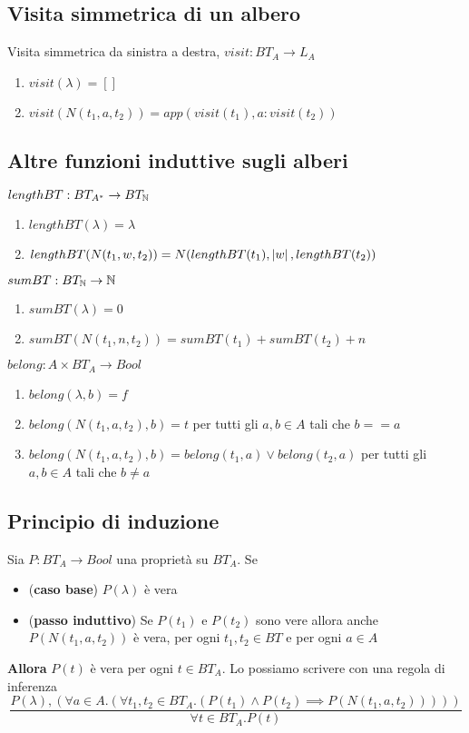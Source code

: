 \documentclass{article}
\begin{document}
\subsection*{Visita simmetrica di un albero}
Visita simmetrica da sinistra a destra, \(visit: BT_A \rightarrow L_A\)
\begin{enumerate}
    \item \(visit(\lambda) = []\)
    \item \(visit(N(t_1, a, t_2)) = app(visit(t_1), a: visit(t_2))\)
\end{enumerate}
\subsection*{Altre funzioni induttive sugli alberi}
\(lengthBT: BT_{A^*} \rightarrow BT_{\mathbb{N}}\)
\begin{enumerate}
    \item \(lengthBT(\lambda) = \lambda\)
    \item \(lengthBT(N(t_1, w, t_2)) = N(lengthBT(t_1), \left\lvert w \right\rvert, lengthBT(t_2))\)
\end{enumerate}
\(sumBT: BT_{\mathbb{N}} \rightarrow \mathbb{N}\)
\begin{enumerate}
    \item \(sumBT(\lambda) = 0\)
    \item \(sumBT(N(t_1, n, t_2)) = sumBT(t_1) + sumBT(t_2) + n\)
\end{enumerate}
\(belong: A \times BT_A \rightarrow Bool\)
\begin{enumerate}
    \item \(belong(\lambda, b) = f\)
    \item \(belong(N(t_1, a, t_2), b) = t\) per tutti gli \(a,b \in A\) tali che \(b == a\)
    \item \(belong(N(t_1, a, t_2), b) = belong(t_1, a) \lor belong(t_2, a)\) per tutti gli \(a,b \in A\) tali che \(b \neq a\)
\end{enumerate}
\subsection*{Principio di induzione}
Sia \(P: BT_A \rightarrow Bool\) una proprietà su \(BT_A\). Se
\begin{itemize}
    \item (\textbf{caso base}) \(P(\lambda)\) è vera
    \item (\textbf{passo induttivo}) Se \(P(t_1)\) e \(P(t_2)\) sono vere allora anche \(P(N(t_1,a, t_2))\) è vera, per ogni \(t_1, t_2 \in BT\) e per ogni \(a \in A\)
\end{itemize}
\textbf{Allora} \(P(t)\) è vera per ogni \(t \in BT_A\). Lo possiamo scrivere con una regola di inferenza
\[\frac{
        P(\lambda), (\forall a \in A . (\forall t_1, t_2 \in BT_A . (P(t_1) \land P(t_2) \implies P(N(t_1, a, t_2)))))
    }{
        \forall t \in BT_A . P(t)
    }
\]
\end{document}
